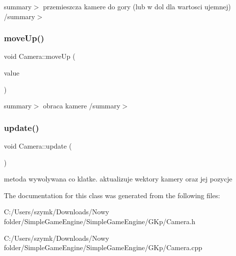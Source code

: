 summary$>$ przemieszcza kamere do gory (lub w dol dla wartosci ujemnej) /summary$>$ \mbox{\label{class_camera_a945b9054e8f7f840d29bff164cf57f65}} 
\subsubsection{\texorpdfstring{move\+Up()}{moveUp()}}
{\footnotesize\ttfamily void Camera\+::move\+Up (\begin{DoxyParamCaption}\item[{G\+Lfloat}]{value }\end{DoxyParamCaption})}

summary$>$ obraca kamere /summary$>$ \mbox{\label{class_camera_a42cda7239981a5618660d04bd5893556}} 
\subsubsection{\texorpdfstring{update()}{update()}}
{\footnotesize\ttfamily void Camera\+::update (\begin{DoxyParamCaption}{ }\end{DoxyParamCaption})}



metoda wywolywana co klatke. aktualizuje wektory kamery oraz jej pozycje 



The documentation for this class was generated from the following files\+:\begin{DoxyCompactItemize}
\item 
C\+:/\+Users/szymk/\+Downloads/\+Nowy folder/\+Simple\+Game\+Engine/\+Simple\+Game\+Engine/\+G\+Kp/Camera.\+h\item 
C\+:/\+Users/szymk/\+Downloads/\+Nowy folder/\+Simple\+Game\+Engine/\+Simple\+Game\+Engine/\+G\+Kp/Camera.\+cpp\end{DoxyCompactItemize}
